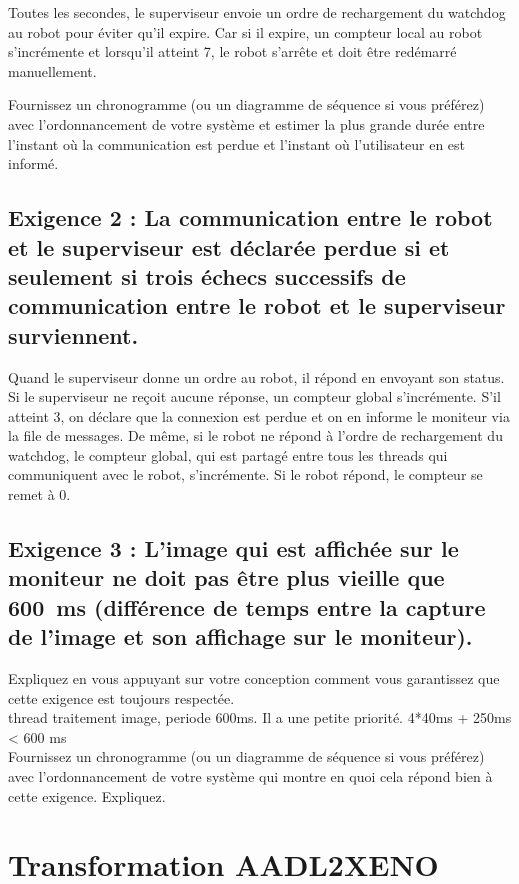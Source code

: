 \documentclass[11pt, a4paper]{paper}
\begin{document}
{\color{black} Toutes les secondes, le superviseur envoie un ordre de rechargement du watchdog au robot pour éviter qu'il expire. Car si il expire, un compteur local au robot s'incrémente et lorsqu'il atteint 7, le robot s'arrête et doit être redémarré manuellement. 

{\color{blue} Fournissez un chronogramme (ou un diagramme de séquence si vous préférez) avec l’ordonnancement de votre système et estimer la plus grande durée entre l'instant où la communication est perdue et l'instant où l'utilisateur en est informé.}

\subsection{Exigence 2 : La communication entre le robot et le superviseur est déclarée perdue si et seulement si trois échecs successifs de communication entre le robot et le superviseur surviennent.}

{\color{black} Quand le superviseur donne un ordre au robot, il répond en envoyant son status. Si le superviseur ne reçoit aucune réponse, un compteur global s'incrémente. S'il atteint 3, on déclare que la connexion est perdue et on en informe le moniteur via la file de messages. De même, si le robot ne répond à l'ordre de rechargement du watchdog, le compteur global, qui est partagé entre tous les threads qui communiquent avec le robot, s'incrémente. Si le robot répond, le compteur se remet à 0. }

\subsection{Exigence 3 : 
L'image qui est  affichée sur le moniteur ne doit pas être plus vieille que 600~ms (différence de temps entre la capture de l'image et son affichage sur le moniteur).}

{\color{blue} Expliquez en vous appuyant sur votre conception comment vous garantissez que cette exigence est toujours respectée. \\}
{\color{black} thread traitement image, periode 600ms. Il a une petite priorité. 4*40ms + 250ms < 600 ms \\}
{\color{blue} Fournissez un chronogramme (ou un diagramme de séquence si vous préférez) avec l’ordonnancement de votre système qui montre en quoi cela répond bien à cette exigence. Expliquez.}


\section{Transformation AADL2XENO}
 
}
\end{document}
